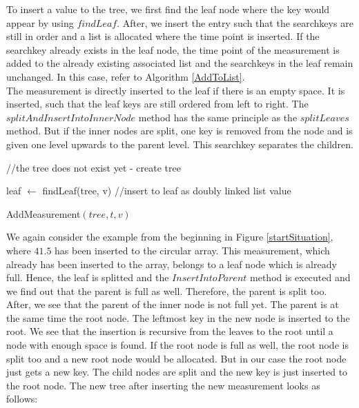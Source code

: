 \documentclass[abstracton,12pt,oneside]{scrreprt}
\begin{document}
To insert a value to the tree, we first find the leaf node where the key would appear by using $findLeaf$. After, we insert the entry such that the searchkeys are still in order and a list is allocated where the time point is inserted. If the searchkey already exists in the leaf node, the time point of the measurement is added to the already existing associated list and the searchkeys in the leaf remain unchanged. In this case, refer to Algorithm \ref{AddToList}. \\
The measurement is directly inserted to the leaf if there is an empty space. It is inserted, such that the leaf keys are still ordered from left to right. The $splitAndInsertIntoInnerNode$ method has the same principle as the $splitLeaves$ method. But if the inner nodes are split, one key is removed from the node and is given one level upwards to the parent level. This searchkey separates the children. 
\BlankLine
\begin{algorithm}[H]
	\IncMargin{1em}
	\SetAlgoLined
	\DontPrintSemicolon
	

		

		 //the tree does not exist yet - create tree\;
		    
		 leaf $\leftarrow$ findLeaf(tree, v)\;
		//insert to leaf as doubly linked list value\;
	
		
	
	

	\caption{AddMeasurement$(tree, t, v)$}	\label{AddMeasurement}
\end{algorithm}



\begin{exmp}
We again consider the example from the beginning in Figure \ref{startSituation}, where $41.5$ has been inserted to the circular array. This measurement, which already has been inserted to the array, belongs to a leaf node which is already full. Hence, the leaf is splitted and the $InsertIntoParent$ method is executed and we find out that the parent is full as well. Therefore, the parent is split too. After, we see that the parent of the inner node is not full yet. The parent is at the same time the root node. The leftmost key in the new node is inserted to the root. We see that the insertion is recursive from the leaves to the root until a node with enough space is found. If the root node is full as well, the root node is split too and a new root node would be allocated. But in our case the root node just gets a new key. The child nodes are split and the new key is just inserted to the root node. The new tree after inserting the new measurement looks as follows:  
\end{exmp}
\end{document}
